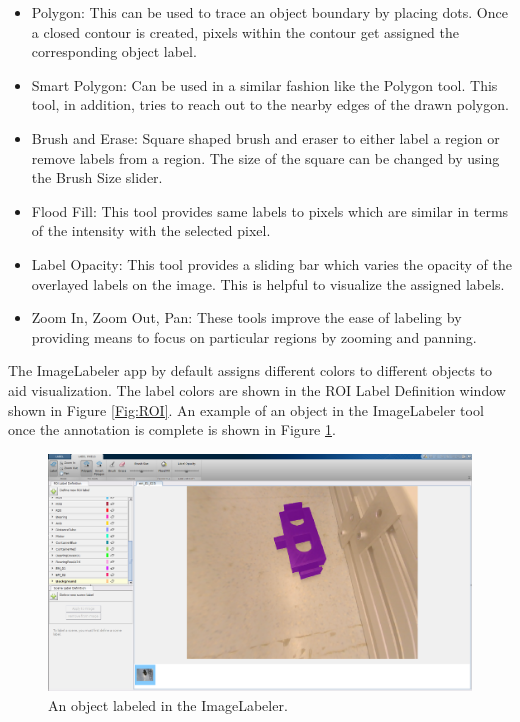	\begin{itemize}
		\item Polygon: This can be used to trace an object boundary by placing dots. Once a closed contour is created, pixels within the contour get assigned the corresponding object label.
		\item Smart Polygon: Can be used in a similar fashion like the Polygon tool. This tool, in addition, tries to reach out to the nearby edges of the drawn polygon.
		\item Brush and Erase: Square shaped brush and eraser to either label a region or remove labels from a region. The size of the square can be changed by using the Brush Size slider.
		\item Flood Fill: This tool provides same labels to pixels which are similar in terms of the intensity with the selected pixel.
		\item Label Opacity: This tool provides a sliding bar which varies the opacity of the overlayed labels on the image. This is helpful to visualize the assigned labels.
		\item Zoom In, Zoom Out, Pan: These tools improve the ease of labeling by providing means to focus on particular regions by zooming and panning.
	\end{itemize}
	
The ImageLabeler app by default assigns different colors to different objects to aid visualization. The label colors are shown in the ROI Label Definition window shown in Figure \ref{Fig:ROI}. An example of an object in the ImageLabeler tool once the annotation is complete is shown in Figure \ref{Fig:ex_ann}.
	
	\begin{figure}
		\centering
		\includegraphics[scale=0.2]{images/imglabler_eg}
		\caption{An object labeled in the ImageLabeler.}
		\label{Fig:ex_ann}
	\end{figure}
	
